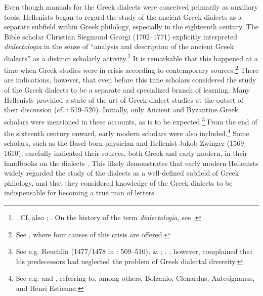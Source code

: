 Even though manuals for the Greek dialects were conceived primarily as auxiliary tools, Hellenists began to regard the study of the ancient Greek dialects as a separate subfield within Greek philology, especially in the eighteenth century. The Bible scholar Christian Siegmund Georgi (1702–1771) explicitly interpreted \textit{dialectologia} in the sense of “analysis and description of the ancient Greek dialects” as a distinct scholarly activity.\footnote{\citet[16]{Georgi1733}. Cf. also \citet[b.1\textsc{\textsuperscript{v}}]{Nibbe1725}; \citet[15]{Hauptmann1737}. On the history of the term \textit{dialectologia}, see \citet[]{VanRooyFcd}.} It is remarkable that this happened at a time when Greek studies were in crisis according to contemporary sources.\footnote{See \citet[86--90]{Reinhard1724}, where four causes of this crisis are offered.} There are indications, however, that even before this time scholars considered the study of the Greek dialects to be a separate and specialized branch of learning. Many Hellenists provided a state of the art of Greek dialect studies at the outset of their discussion (cf. \citealt{VanRooy2014}: 519–520). Initially, only Ancient and Byzantine Greek scholars were mentioned in these accounts, as is to be expected.\footnote{See e.g. Reuchlin (1477/1478 in \citealt{VanRooy2014}: 509–510); \citet[\textsc{r.}iii\textsc{\textsuperscript{r}}]{Amerot1520} \&  \citet[title]{Amerot1530}; \citet[α.3\textsc{\textsuperscript{r}}]{Ruland1556}.
\citet[a.3\textsc{\textsuperscript{v}}]{Canini1555}, however, complained that his predecessors had neglected the problem of Greek dialectal diversity.} From the end of the sixteenth century onward, early modern scholars were also included.\footnote{See e.g. \citet[†.7\textsc{\textsuperscript{r}}]{Walper1589} and \citet[1]{Schmidt1604}, referring to, among others, Bolzanio, Clenardus, Antesignanus, and Henri Estienne.} Some scholars, such as the Basel-born physician and Hellenist Jakob Zwinger (1569–1610), carefully indicated their sources, both Greek and early modern, in their handbooks on the dialects \citep{Zwinger1605}. This likely demonstrates that early modern Hellenists widely regarded the study of the dialects as a well-defined subfield of Greek philology, and that they considered knowledge of the Greek dialects to be indispensable for becoming a true man of letters.

